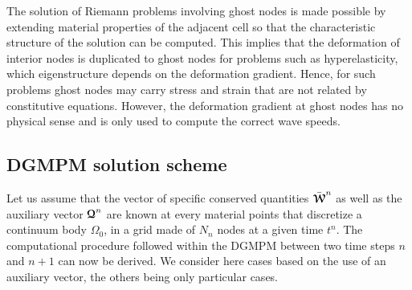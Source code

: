 \begin{remark}
  \label{rq:BC_ghostnode}
  The solution of Riemann problems involving ghost nodes is made possible by extending material properties of the adjacent cell so that the characteristic structure of the solution can be computed. This implies that the deformation of interior nodes is duplicated to ghost nodes for problems such as hyperelasticity, which eigenstructure depends on the deformation gradient. Hence, for such problems ghost nodes may carry stress and strain that are not related by constitutive equations. However, the deformation gradient at ghost nodes has no physical sense and is only used to compute the correct wave speeds.
\end{remark}

\subsection{DGMPM solution scheme}
Let us assume that the vector of specific conserved quantities $\bar{{\boldsymbol{\mathcal{W}}}}^n$ as well as the auxiliary vector ${\boldsymbol{\mathcal{Q}}}^n$ are known at every material points that discretize a continuum body $\Omega_0$, in a grid made of $N_{n}$ nodes at a given time $t^n$. The computational procedure followed within the DGMPM between two time steps $n$ and $n+1$ can now be derived. We consider here cases based on the use of an auxiliary vector, the others being only particular cases.


